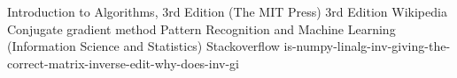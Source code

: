 \begin{thebibliography}{99}
    Introduction to Algorithms, 3rd Edition (The MIT Press) 3rd Edition
    Wikipedia Conjugate gradient method
    Pattern Recognition and Machine Learning (Information Science and Statistics)
    Stackoverflow is-numpy-linalg-inv-giving-the-correct-matrix-inverse-edit-why-does-inv-gi
\end{thebibliography}
